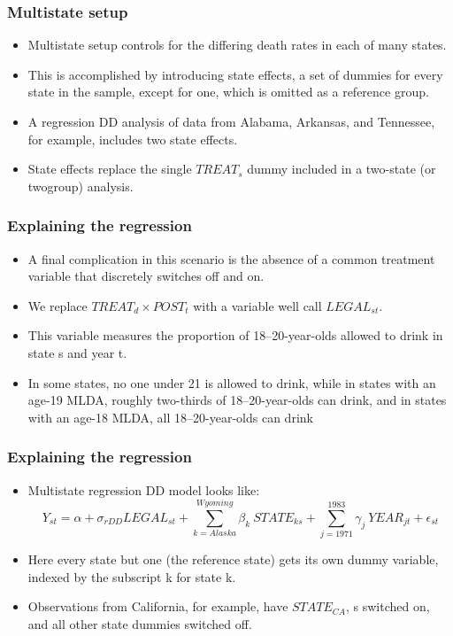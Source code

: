 \documentclass{beamer}
\begin{document}

\begin{frame}
\frametitle{Multistate setup}
\begin{itemize}
	\item Multistate setup controls for the differing death rates in each of many states. 
	\item This is accomplished by introducing state effects, a set of dummies for every state in the sample, except for one, which is omitted as a reference group.
	\item A regression DD analysis of data from Alabama, Arkansas, and Tennessee, for example, includes two state effects. 
	\item State effects replace the single $TREAT_s$ dummy included in a two-state (or twogroup) analysis.

\end{itemize}

\end{frame}

\begin{frame}
\frametitle{Explaining the regression}
\begin{itemize}
	\item A final complication in this scenario is the absence of a common treatment variable that discretely switches off and on.
	\item We replace $TREAT_d ×POST_t$ with a variable well call $LEGAL_{st}$. 
	\item This variable measures the proportion of 18–20-year-olds allowed to drink in state s and year t. 
	\item In some states, no one under 21 is allowed to drink, while in states with an age-19 MLDA, roughly two-thirds of 18–20-year-olds can drink, and in states with an age-18 MLDA, all 18–20-year-olds can drink

\end{itemize}
\end{frame}


\begin{frame}
\frametitle{Explaining the regression}
	\begin{itemize}
		\item Multistate regression DD model looks like: 
\small$$Y_{st}=\alpha +\sigma_{rDD} LEGAL_{st} + \sum_{k=Alaska}^{Wyoming}\beta_k~ STATE_{ks} + \sum_{j=1971}^{1983}\gamma_j~YEAR_{jt} + \epsilon_{st}$$
		\item Here every state but one (the reference state) gets its own dummy variable, indexed by the subscript k for state k. 
		\item Observations from California, for example, have $STATE_{CA}$, s switched on, and all other state dummies switched off.

	\end{itemize}

\end{frame}
\end{document}
